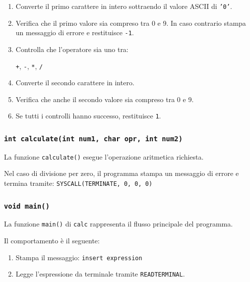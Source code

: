 \documentclass[a4paper,12pt]{article}
\begin{document}
\begin{enumerate}
\begin{enumerate}
    \item Converte il primo carattere in intero sottraendo il valore ASCII di \texttt{'0'}.

    \item Verifica che il primo valore sia compreso tra 0 e 9. In caso contrario stampa un messaggio di errore e restituisce \texttt{-1}.

    \item Controlla che l'operatore sia uno tra:
    \begin{center}
        \texttt{+}, \texttt{-}, \texttt{*}, \texttt{/}
    \end{center}

    \item Converte il secondo carattere in intero.

    \item Verifica che anche il secondo valore sia compreso tra 0 e 9.

    \item Se tutti i controlli hanno successo, restituisce \texttt{1}.
\end{enumerate}

\vspace{0.3cm}
\subsubsection{\texttt{int calculate(int num1, char opr, int num2)}}

La funzione \texttt{calculate()} esegue l'operazione aritmetica richiesta.

Nel caso di divisione per zero, il programma stampa un messaggio di errore e termina tramite:
\texttt{SYSCALL(TERMINATE, 0, 0, 0)}

\vspace{0.3cm}
\subsubsection{\texttt{void main()}}

La funzione \texttt{main()} di \texttt{calc} rappresenta il flusso principale del programma.

Il comportamento è il seguente:

\begin{enumerate}
    \item Stampa il messaggio:
        \texttt{insert expression}

    \item Legge l'espressione da terminale tramite \texttt{READTERMINAL}.


\end{enumerate}
\end{enumerate}
\end{document}

